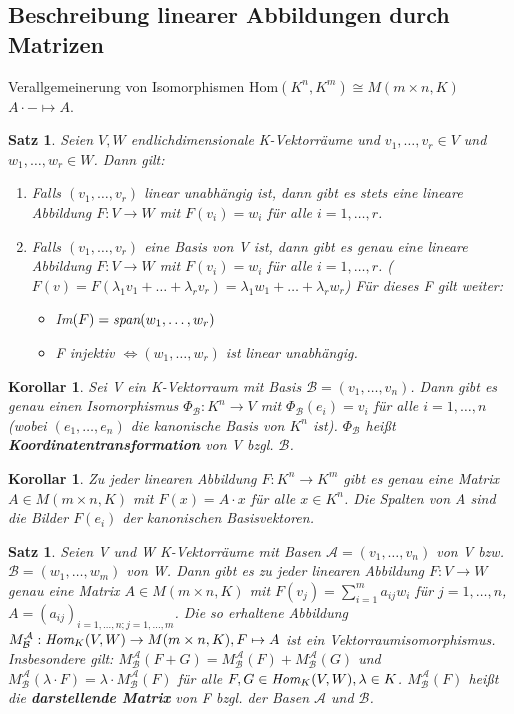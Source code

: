 \documentclass[12pt,a4paper]{article}
\theoremstyle{plain}
\newtheorem{Satz}[Theorem]{Satz}
\newtheorem{Korollar}[Theorem]{Korollar}
\newcommand{\herv}[1]{{\emph{\textbf{#1}}}}
\numberwithin{equation}{section}
\begin{document}
\subsection{Beschreibung linearer Abbildungen durch Matrizen}
Verallgemeinerung von Isomorphismen Hom$(K^n,K^m)\cong M(m\times n,K)$ $A\cdot - \mapsto A$.
\begin{Satz}
Seien $V,W$ endlichdimensionale K-Vektorräume und $v_1,\ldots,v_r\in V$ und $w_1,\ldots,w_r\in W$. Dann gilt:
\begin{enumerate}
\renewcommand{\labelenumi}{\emph{(\roman{enumi})}}
\item Falls $(v_1,\ldots,v_r)$ linear unabhängig ist, dann gibt es stets eine lineare Abbildung $F:V\rightarrow W$ mit $F(v_i)=w_i$ für alle $i=1,\ldots,r$.
\item Falls $(v_1,\ldots,v_r)$ eine Basis von V ist, dann gibt es genau eine lineare Abbildung $F:V\rightarrow W$ mit $F(v_i)=w_i$ für alle $i=1,\ldots,r$. ($F(v)=F(\lambda_1v_1+\ldots+\lambda_rv_r)=\lambda_1w_1+\ldots+\lambda_rw_r$)
Für dieses F gilt weiter:
\begin{itemize}
\item \emph{Im}$(F)=\emph{span}(w_1,\ldots,w_r)$
\item F injektiv $\Leftrightarrow (w_1,\ldots,w_r)$ ist linear unabhängig.
\end{itemize}
\end{enumerate}
\end{Satz}
\begin{Korollar}
Sei V ein K-Vektorraum mit Basis $\mathcal{B}=(v_1,\ldots,v_n)$. Dann gibt es genau einen Isomorphismus $\Phi_\mathcal{B}:K^n \rightarrow V$ mit $\Phi_\mathcal{B}(e_i)=v_i$ für alle $i=1,\ldots,n$ (wobei $(e_1,\ldots,e_n)$ die kanonische Basis von $K^n$ ist). $\Phi_\mathcal{B}$ heißt \herv{Koordinatentransformation} von V bzgl. $\mathcal{B}$.
\end{Korollar}
\begin{Korollar}
Zu jeder linearen Abbildung $F:K^n\rightarrow K^m$ gibt es genau eine Matrix $A\in M(m\times n,K)$ mit $F(x)=A\cdot x$ für alle $x\in K^n$. Die Spalten von A sind die Bilder $F(e_i)$ der kanonischen Basisvektoren.
\end{Korollar}
\begin{Satz}
Seien V und W K-Vektorräume mit Basen $\mathcal{A}=(v_1,\ldots,v_n)$ von V bzw. $\mathcal{B}=(w_1,\ldots,w_m)$ von W. Dann gibt es zu jeder linearen Abbildung $F:V\rightarrow W$ genau eine Matrix $A\in M(m\times n,K)$ mit $F(v_j)=\sum_{i=1}^m{a_{ij}w_i}$ für $j=1,\ldots,n$, $A=(a_{ij})_{i=1,\ldots,n; j=1,\ldots,m}$. Die so erhaltene Abbildung $M^\mathcal{A}_\mathcal{B}: \emph{Hom}_K(V,W)\rightarrow M(m\times n, K), F\mapsto A$ ist ein Vektorraumisomorphismus. Insbesondere gilt: $M^\mathcal{A}_\mathcal{B}(F+G)=M^\mathcal{A}_\mathcal{B}(F)+M^\mathcal{A}_\mathcal{B}(G)$ und $M^\mathcal{A}_\mathcal{B}(\lambda\cdot F)=\lambda \cdot M^\mathcal{A}_\mathcal{B}(F)$ für alle $F,G\in \emph{Hom}_K(V,W),\lambda \in K$. $M^\mathcal{A}_\mathcal{B}(F)$ heißt die \herv{darstellende Matrix} von F bzgl. der Basen $\mathcal{A}$ und $\mathcal{B}$.
\end{Satz}
\end{document}
